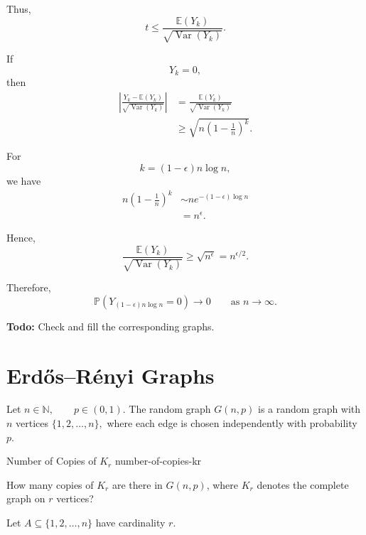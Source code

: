 \begin{question}
Thus,
\[
    t
    \leq
    \frac{\mathbb{E}(Y_k)}
    {\sqrt{\operatorname{Var}(Y_k)}}.
\]

If
\[
    Y_k=0,
\]
then
\[
\begin{aligned}
    \left|
        \frac{Y_k-\mathbb{E}(Y_k)}
        {\sqrt{\operatorname{Var}(Y_k)}}
    \right|
    &=
    \frac{\mathbb{E}(Y_k)}
    {\sqrt{\operatorname{Var}(Y_k)}} \\
    &\geq
    \sqrt{
        n\left(1-\frac{1}{n}\right)^k
    }.
\end{aligned}
\]

For
\[
    k=(1-\epsilon)n\log n,
\]
we have
\[
\begin{aligned}
    n\left(1-\frac{1}{n}\right)^k
    &\sim
    n e^{-(1-\epsilon)\log n} \\
    &=
    n^\epsilon.
\end{aligned}
\]

Hence,
\[
    \frac{\mathbb{E}(Y_k)}
    {\sqrt{\operatorname{Var}(Y_k)}}
    \geq
    \sqrt{n^\epsilon}
    =
    n^{\epsilon/2}.
\]

Therefore,
\[
    \mathbb{P}
    \left(
        Y_{(1-\epsilon)n\log n}=0
    \right)
    \longrightarrow 0
    \qquad\text{as }n\to\infty.
\]

\end{question}

\textbf{Todo:} Check and fill the corresponding graphs.



\section{Erdős--Rényi Graphs}

Let
\(
    n\in\mathbb{N},
    \qquad
    p\in(0,1).
\)
The random graph
\(
    G(n,p)
\)
is a random graph with $n$ vertices
\(
    \{1,2,\ldots,n\},
\)
where each edge is chosen independently with probability $p$.

\begin{question}
{Number of Copies of $K_r$}
{number-of-copies-kr}

How many copies of $K_r$ are there in $G(n,p)$, where $K_r$
denotes the complete graph on $r$ vertices?
\end{question}

Let
\(
    A\subseteq\{1,2,\ldots,n\}
\)
have cardinality $r$.

